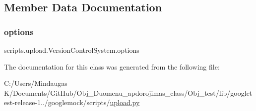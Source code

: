 \subsection{Member Data Documentation}
\mbox{\label{classscripts_1_1upload_1_1_version_control_system_a090853e1034cd5dfe4fd0118201e5af1}} 
\subsubsection{\texorpdfstring{options}{options}}
{\footnotesize\ttfamily scripts.\+upload.\+Version\+Control\+System.\+options}



The documentation for this class was generated from the following file\+:\begin{DoxyCompactItemize}
\item 
C\+:/\+Users/\+Mindaugas K/\+Documents/\+Git\+Hub/\+Obj\+\_\+\+Duomenu\+\_\+apdorojimas\+\_\+class/\+Obj\+\_\+test/lib/googletest-\/release-\/1../googlemock/scripts/\mbox{\hyperlink{_obj__test_2lib_2googletest-release-1_88_81_2googlemock_2scripts_2upload_8py}{upload.\+py}}\end{DoxyCompactItemize}
